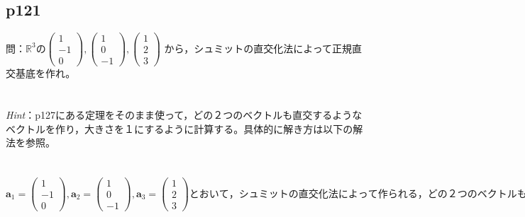 \documentclass[dvipdfmx,uplatex,11pt]{jsarticle}
\begin{document}
\subsection{p121}
問：$\mathbb{R}^3の
\begin{pmatrix}
1 \\
-1 \\
0
\end{pmatrix}
,
\begin{pmatrix}
1 \\
0 \\
-1
\end{pmatrix}
,
\begin{pmatrix}
1 \\
2 \\
3
\end{pmatrix}
$
から，シュミットの直交化法によって正規直交基底を作れ。\\ \\ \\
\textsl{Hint}：p127にある定理をそのまま使って，どの２つのベクトルも直交するようなベクトルを作り，大きさを１にするように計算する。具体的に解き方は以下の解法を参照。\\
\dotfill \\ \\
$\bm{a}_1=
\begin{pmatrix}
1 \\
-1 \\
0
\end{pmatrix}
,\bm{a}_2=
\begin{pmatrix}
1 \\
0 \\
-1
\end{pmatrix}
,\bm{a}_3=
\begin{pmatrix}
1 \\
2 \\
3
\end{pmatrix}
とおいて，シュミットの直交化法によって作られる，どの２つのベクトルも直交するようなベクトルを\bm{b}_1, \bm{b}_2, \bm{b}_3 ，正規直交基底を\bm{c}_1, \bm{c}_2, \bm{c}_3 とする。$
\end{document}
